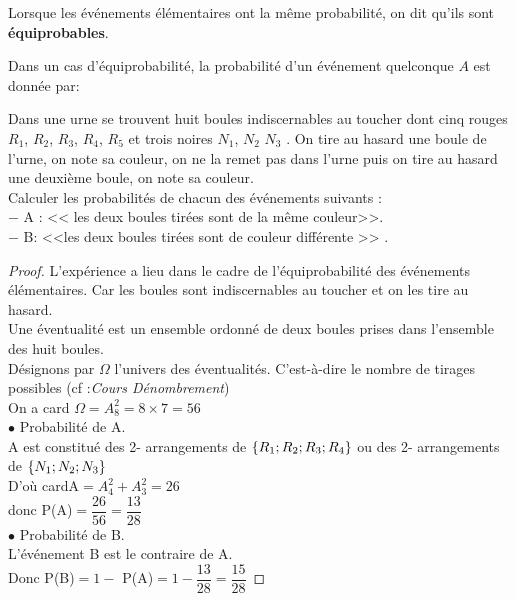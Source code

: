 \begin{definition}
Lorsque les événements élémentaires ont la même probabilité, on dit qu'ils sont \textbf{ équiprobables}.
\end{definition}
\begin{property}
Dans un cas d'équiprobabilité, la probabilité d'un événement quelconque  $A$ est donnée par:
\begin{center}
\end{center}

\end{property}
 
 \begin{exercice}
 Dans une urne se trouvent huit boules  indiscernables au toucher dont cinq rouges $ R_{1} $, $ R_{2} $, $ R_{3} $,  $ R_{4} $, $ R_{5} $  et trois noires $ N_{1} $, $ N_{2} $ $ N_{3} $ .
On tire au hasard une boule de l'urne, on note sa couleur, on ne la remet pas dans l'urne puis on tire au hasard une deuxième boule, on note sa couleur. \\ Calculer  les  probabilités de chacun des  événements suivants :\\
$ - $ A : << les deux boules tirées sont de la même couleur>>.\\ 
$ - $ B: <<les deux boules tirées sont de couleur différente >> . 


\end{exercice}
  
  \bigskip
  \begin{proof}
    L'expérience a lieu dans le cadre de l'équiprobabilité des événements élémentaires.  Car les boules sont indiscernables au toucher et on les tire au hasard.\\ Une éventualité est un ensemble ordonné de deux boules prises dans l'ensemble des huit boules.\\
 Désignons par $ \Omega $  l'univers des éventualités.  C'est-à-dire le nombre de tirages possibles (cf :\textit{Cours Dénombrement})\\
 
  On a card $\Omega=A_{8}^{2}=8\times 7=56$\\

 $ \bullet $ Probabilité de A.\\

 A est constitué des 2- arrangements de $ \left\{R_{1}; R_{2} ;R_{3} ;R_{4} \right\} $ ou des 2- arrangements de $ \left\{N_{1}; N_{2} ;N_{3}\right\} $\\
 
 D'où cardA$ =A_{4}^{2}+A_{3}^{2} =26$\\
 
 donc P(A)$ =\dfrac{26}{56}=\dfrac{13}{28}$\\
 
  $ \bullet $ Probabilité de B.\\

L'événement B est le contraire de A.\\

Donc P(B)$ =1- $ P(A)$ =1-\dfrac{13}{28}=\dfrac{15}{28} $
 \end{proof}
 

